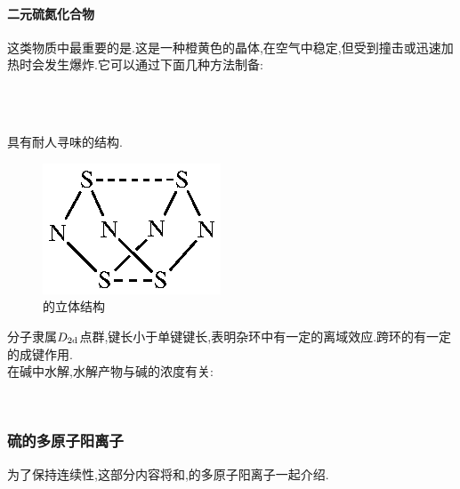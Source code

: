 \documentclass{ctexart}
\begin{document}
\paragraph{二元硫氮化合物}
这类物质中最重要的是.这是一种橙黄色的晶体,在空气中稳定,但受到撞击或迅速加热时会发生爆炸.它可以通过下面几种方法制备:
\begin{center}
    \\
    \\
\end{center}
\indent{}具有耐人寻味的结构.
\begin{figure}[H]
    \centering\includegraphics{picture/S4N4.eps}
    \caption{的立体结构}
\end{figure}
分子隶属$D_{2\text d}$点群,键长小于单键键长,表明杂环中有一定的离域效应.跨环的有一定的成键作用.\\
\indent {}在碱中水解,水解产物与碱的浓度有关:
\begin{center}
    \\
\end{center}
\subsubsection{硫的多原子阳离子}
为了保持连续性,这部分内容将和,的多原子阳离子一起介绍.
\end{document}
